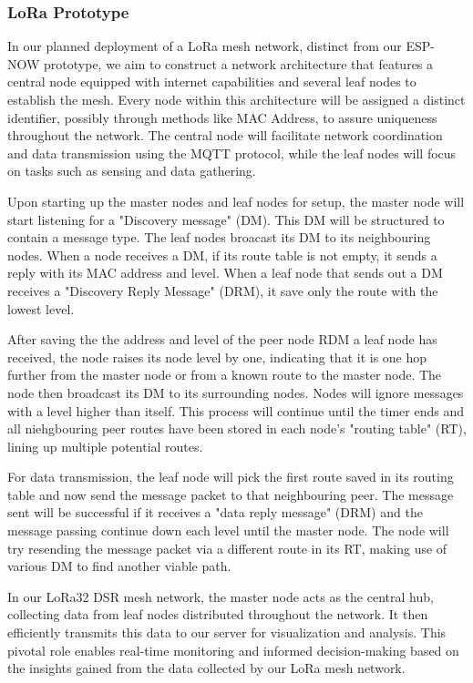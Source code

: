 \subsubsection{LoRa Prototype}

In our planned deployment of a LoRa mesh network, distinct from our ESP-NOW prototype, we aim to construct a network architecture that features a central node equipped with internet capabilities and several leaf nodes to establish the mesh. Every node within this architecture will be assigned a distinct identifier, possibly through methods like MAC Address, to assure uniqueness throughout the network. The central node will facilitate network coordination and data transmission using the MQTT protocol, while the leaf nodes will focus on tasks such as sensing and data gathering.

Upon starting up the master nodes and leaf nodes for setup, the master node will start listening for a "Discovery message" (DM). This DM will be structured to contain a message type. The leaf nodes broacast its DM to its neighbouring nodes. When a node receives a DM, if its route table is not empty, it sends a reply with its MAC address and level. When a leaf node that sends out a DM receives a "Discovery Reply Message" (DRM), it save only the route with the lowest level.

After saving the the address and level of the peer node RDM a leaf node has received, the node raises its node level by one, indicating that it is one hop further from the master node or from a known route to the master node. The node then broadcast its DM to its surrounding nodes. Nodes will ignore messages with a level higher than itself. This process will continue until the timer ends and all niehgbouring peer routes have been stored in each node's "routing table" (RT), lining up multiple potential routes.

For data transmission, the leaf node will pick the first route saved in its routing table and now send the message packet to that neighbouring peer. The message sent will be successful if it receives a "data reply message" (DRM) and the message passing continue down each level until the master node. The node will try resending the message packet via a different route in its RT, making use of various DM to find another viable path.

In our LoRa32 DSR mesh network, the master node acts as the central hub, collecting data from leaf nodes distributed throughout the network. It then efficiently transmits this data to our server for visualization and analysis. This pivotal role enables real-time monitoring and informed decision-making based on the insights gained from the data collected by our LoRa mesh network.

